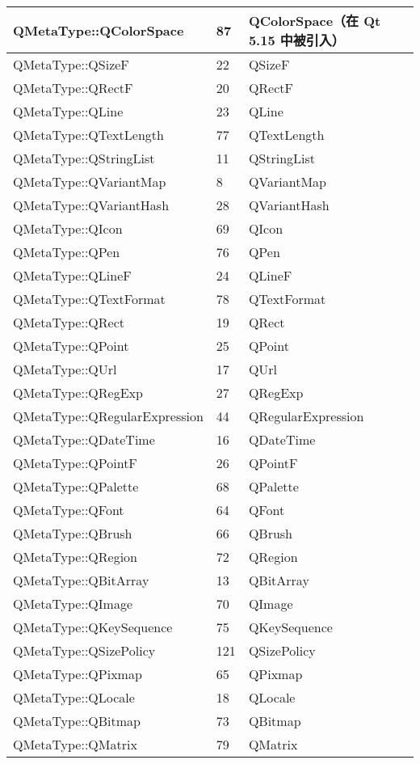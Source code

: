 \begin{longtable}{|l|l|m{20em}|}
\hline
QMetaType::QColorSpace&	87&	QColorSpace（在 Qt 5.15 中被引入）\\
\hline
QMetaType::QSizeF	&22	&QSizeF\\
\hline
QMetaType::QRectF	&20	&QRectF\\
\hline
QMetaType::QLine	&23	&QLine\\
\hline
QMetaType::QTextLength	&77&	QTextLength\\
\hline
QMetaType::QStringList	&11&	QStringList\\
\hline
QMetaType::QVariantMap	&8&	QVariantMap\\
\hline
QMetaType::QVariantHash	&28&	QVariantHash\\
\hline
QMetaType::QIcon&	69&	QIcon\\
\hline
QMetaType::QPen	&76	&QPen \\
\hline
QMetaType::QLineF	&24&	QLineF\\
\hline
QMetaType::QTextFormat&	78&	QTextFormat \\
\hline
QMetaType::QRect&	19	&QRect \\
\hline
QMetaType::QPoint&	25	&QPoint \\
\hline
QMetaType::QUrl	&17	&QUrl \\
\hline
QMetaType::QRegExp	&27	&QRegExp \\
\hline
QMetaType::QRegularExpression	&44	&QRegularExpression \\
\hline
QMetaType::QDateTime	&16&	QDateTime\\
\hline
QMetaType::QPointF	&26&	QPointF\\
\hline
QMetaType::QPalette	&68	&QPalette\\
\hline
QMetaType::QFont	&64&	QFont\\
\hline
QMetaType::QBrush	&66	&QBrush\\
\hline
QMetaType::QRegion&	72&	QRegion\\
\hline
QMetaType::QBitArray&	13	&QBitArray\\
\hline
QMetaType::QImage	&70	&QImage\\
\hline
QMetaType::QKeySequence	&75	&QKeySequence\\
\hline
QMetaType::QSizePolicy&	121&	QSizePolicy\\
\hline
QMetaType::QPixmap&	65	&QPixmap\\
\hline
QMetaType::QLocale&	18	&QLocale\\
\hline
QMetaType::QBitmap&	73&	QBitmap\\
\hline
QMetaType::QMatrix&	79&	QMatrix\\

\end{longtable}
